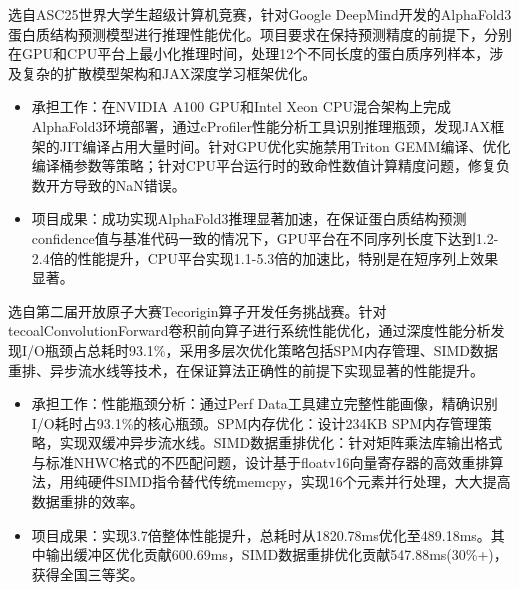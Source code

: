 \documentclass{resume}
\begin{document}
选自ASC25世界大学生超级计算机竞赛，针对Google DeepMind开发的AlphaFold3蛋白质结构预测模型进行推理性能优化。项目要求在保持预测精度的前提下，分别在GPU和CPU平台上最小化推理时间，处理12个不同长度的蛋白质序列样本，涉及复杂的扩散模型架构和JAX深度学习框架优化。
\begin{itemize}
  \item 承担工作：在NVIDIA A100 GPU和Intel Xeon CPU混合架构上完成AlphaFold3环境部署，通过cProfiler性能分析工具识别推理瓶颈，发现JAX框架的JIT编译占用大量时间。针对GPU优化实施禁用Triton GEMM编译、优化编译桶参数等策略；针对CPU平台运行时的致命性数值计算精度问题，修复负数开方导致的NaN错误。
  \item 项目成果：成功实现AlphaFold3推理显著加速，在保证蛋白质结构预测confidence值与基准代码一致的情况下，GPU平台在不同序列长度下达到1.2-2.4倍的性能提升，CPU平台实现1.1-5.3倍的加速比，特别是在短序列上效果显著。
\end{itemize}

选自第二届开放原子大赛Tecorigin算子开发任务挑战赛。针对tecoalConvolutionForward卷积前向算子进行系统性能优化，通过深度性能分析发现I/O瓶颈占总耗时93.1\%，采用多层次优化策略包括SPM内存管理、SIMD数据重排、异步流水线等技术，在保证算法正确性的前提下实现显著的性能提升。
\begin{itemize}
  \item 承担工作：性能瓶颈分析：通过Perf Data工具建立完整性能画像，精确识别I/O耗时占93.1\%的核心瓶颈。SPM内存优化：设计234KB SPM内存管理策略，实现双缓冲异步流水线。SIMD数据重排优化：针对矩阵乘法库输出格式与标准NHWC格式的不匹配问题，设计基于floatv16向量寄存器的高效重排算法，用纯硬件SIMD指令替代传统memcpy，实现16个元素并行处理，大大提高数据重排的效率。
  \item 项目成果：实现3.7倍整体性能提升，总耗时从1820.78ms优化至489.18ms。其中输出缓冲区优化贡献600.69ms，SIMD数据重排优化贡献547.88ms(30\%+)，获得全国三等奖。
\end{itemize}
\end{document}
